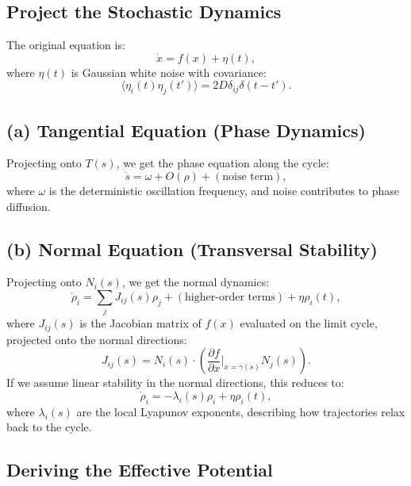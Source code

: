 \documentclass{article}
\theoremstyle{definition} \newtheorem{definition}{Definition}
\theoremstyle{remark} \newtheorem{remark}{Remark}
\newcounter{ct}
\begin{document}
\subsection{Project the Stochastic Dynamics}

The original equation is:
\begin{equation}
    \dot{x} = f(x) + \eta(t),
\end{equation}
where $\eta(t)$ is Gaussian white noise with covariance:
\begin{equation}
    \langle \eta_i(t) \eta_j(t') \rangle = 2D \delta_{ij} \delta(t - t').
\end{equation}

\subsection{(a) Tangential Equation (Phase Dynamics)}
Projecting onto $T(s)$, we get the phase equation along the cycle:
\begin{equation}
    \dot{s} = \omega + O(\rho) + (\text{noise term}),
\end{equation}
where $\omega$ is the deterministic oscillation frequency, and noise contributes to phase diffusion.

\subsection{(b) Normal Equation (Transversal Stability)}
Projecting onto $N_i(s)$, we get the normal dynamics:
\begin{equation}
    \dot{\rho}_i = \sum_j J_{ij}(s) \rho_j + (\text{higher-order terms}) + \eta \rho_i(t),
\end{equation}
where $J_{ij}(s)$ is the Jacobian matrix of $f(x)$ evaluated on the limit cycle, projected onto the normal directions:
\begin{equation}
    J_{ij}(s) = N_i(s) \cdot \left( \frac{\partial f}{\partial x} \bigg|_{x = \gamma(s)} N_j(s) \right).
\end{equation}
If we assume linear stability in the normal directions, this reduces to:
\begin{equation}
    \dot{\rho}_i = -\lambda_i(s) \rho_i + \eta \rho_i(t),
\end{equation}
where $\lambda_i(s)$ are the local Lyapunov exponents, describing how trajectories relax back to the cycle.

\subsection{Deriving the Effective Potential}
\end{document}
